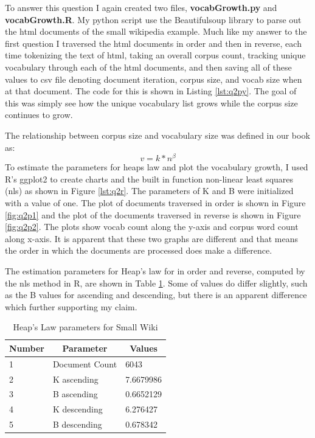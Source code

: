 \documentclass[letterpaper,11pt]{article}
\newcommand*{\srcPath}{../src}%
\begin{document}
To answer this question I again created two files, \textbf{vocabGrowth.py} and \textbf{vocabGrowth.R}.
My python script use the Beautifulsoup library to parse out the html documents of the small wikipedia example.
Much like my answer to the first question I traversed the html documents in order and then in reverse, each time tokenizing the text of html, taking an overall corpus count,  tracking unique vocabulary through each of the html documents, and then saving all of these values to csv file denoting document iteration, corpus size, and vocab size when at that document.
The code for this is shown in Listing \ref{lst:q2py}.
The goal of this was simply see how the unique vocabulary list grows while the corpus size continues to grow.

  

The relationship between corpus size and vocabulary size was defined in our book as: \[ v = k * n^\beta \]
To estimate the parameters for heaps law and plot the vocabulary growth, I used R's ggplot2 to create charts and the built in function non-linear least squares (nls) as shown in Figure \ref{lst:q2r}.
The parameters of K and B were initialized with a value of one. 
The plot of documents traversed in order is shown in Figure \ref{fig:q2p1} and the plot of the documents traversed in reverse is shown in Figure \ref{fig:q2p2}.
The plots show vocab count along the y-axis and corpus word count along x-axis.
It is apparent that these two graphs are different and that means the order in which the documents are processed does make a difference.

The estimation parameters for Heap's law for in order and reverse, computed by the nls method in R, are shown in Table \ref{table:heap}. 
Some of values do differ slightly, such as the B values for ascending and descending, but there is an apparent difference which further supporting my claim.

  

\begin{table}
\centering
\begin{tabular}{|l|l|l|}
\hline
\multicolumn{1}{|c|}{\textbf{Number}} & \multicolumn{1}{c|}{\textbf{Parameter}} & \multicolumn{1}{c|}{\textbf{Values}} \\ \hline
1 & Document Count & 6043 \\ \hline
2 & K ascending & 7.6679986 \\ \hline
3 & B ascending & 0.6652129 \\ \hline
4 & K descending & 6.276427 \\ \hline
5 & B descending & 0.678342 \\ \hline
\end{tabular}
\caption{Heap's Law parameters for Small Wiki}
\label{table:heap}
\end{table}
\end{document}

